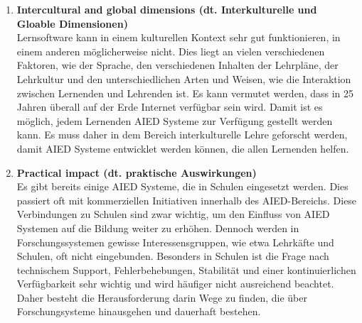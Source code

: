 \begin{enumerate}
      \item \textbf{Intercultural and global dimensions (dt. Interkulturelle und Gloable Dimensionen)} \\
            Lernsoftware kann in einem kulturellen Kontext sehr gut funktionieren, in einem anderen möglicherweise nicht. Dies liegt an vielen verschiedenen Faktoren, wie der Sprache, den verschiedenen Inhalten der Lehrpläne, der Lehrkultur und den unterschiedlichen Arten und Weisen, wie die Interaktion zwischen Lernenden und Lehrenden ist. Es kann vermutet werden, dass in 25 Jahren überall auf der Erde Internet verfügbar sein wird. Damit ist es möglich, jedem Lernenden AIED Systeme zur Verfügung gestellt werden kann. Es muss daher in dem Bereich interkulturelle Lehre geforscht werden, damit AIED Systeme entwicklet werden können, die allen Lernenden helfen. \cite[S. 9f]{Pinkwart.2016}

      \item \textbf{Practical impact (dt. praktische Auswirkungen)} \\
            Es gibt bereits einige AIED Systeme, die in Schulen eingesetzt werden. Dies passiert oft mit kommerziellen Initiativen innerhalb des AIED-Bereichs.
            Diese Verbindungen zu Schulen sind zwar wichtig, um den Einfluss von AIED Systemen auf die Bildung weiter zu erhöhen. Dennoch werden in Forschungssystemen gewisse Interessensgruppen, wie etwa Lehrkäfte und Schulen, oft nicht eingebunden.
            Besonders in Schulen ist die Frage nach technischem Support, Fehlerbehebungen, Stabilität und einer kontinuierlichen Verfügbarkeit sehr wichtig und wird häufiger nicht ausreichend beachtet.
            Daher besteht die Herausforderung darin Wege zu finden, die über Forschungsysteme hinausgehen und dauerhaft bestehen. \cite[S. 10]{Pinkwart.2016}


\end{enumerate}

